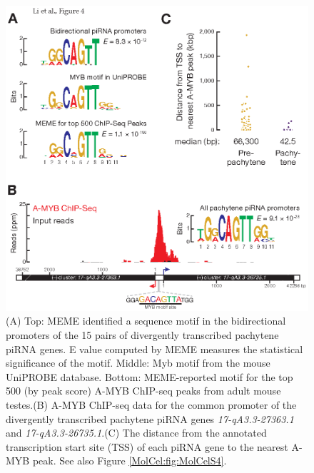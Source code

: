     \begin{figure} %
      \centering 
      \includegraphics{Figures/MolCel/MolCel2013_Fig4.eps}
      \caption[A-MYB Binds the Promoters of Pachytene piRNA Genes]
      {
       (A) Top: MEME identified a sequence motif in the bidirectional promoters of the 15 pairs of divergently transcribed pachytene piRNA genes. E value computed by MEME measures the statistical significance of the motif. Middle: Myb motif from the mouse UniPROBE database. Bottom: MEME-reported motif for the top 500 (by peak score) A-MYB ChIP-seq peaks from adult mouse testes.(B) A-MYB ChIP-seq data for the common promoter of the divergently transcribed pachytene piRNA genes \textit{17-qA3.3-27363.1} and \textit{17-qA3.3-26735.1}.(C) The distance from the annotated transcription start site (TSS) of each piRNA gene to the nearest A-MYB peak. See also Figure \ref{MolCel:fig:MolCelS4}.
      	}
      \label{MolCel:fig:MolCelF4}
    	\end{figure}
